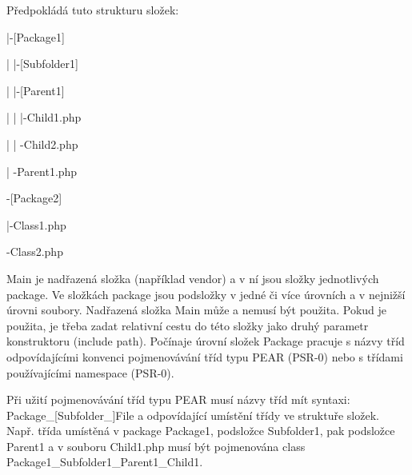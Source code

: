 Předpokládá tuto strukturu složek\+:


\begin{DoxyPre}[Main]\end{DoxyPre}
 
\begin{DoxyPre} |-[Package1]\end{DoxyPre}
 
\begin{DoxyPre} |  |-[Subfolder1]\end{DoxyPre}
 
\begin{DoxyPre} |     |-[Parent1]\end{DoxyPre}
 
\begin{DoxyPre} |     |  |-Child1.php\end{DoxyPre}
 
\begin{DoxyPre} |     |   -Child2.php\end{DoxyPre}
 
\begin{DoxyPre} |      -Parent1.php\end{DoxyPre}
 
\begin{DoxyPre}  -[Package2]\end{DoxyPre}
 
\begin{DoxyPre}    |-Class1.php\end{DoxyPre}
 
\begin{DoxyPre}     -Class2.php\end{DoxyPre}
 

Main je nadřazená složka (například vendor) a v ní jsou složky jednotlivých package. Ve složkách package jsou podsložky v jedné či více úrovních a v nejnižší úrovni soubory. Nadřazená složka Main může a nemusí být použita. Pokud je použita, je třeba zadat relativní cestu do této složky jako druhý parametr konstruktoru (include path). Počínaje úrovní složek Package pracuje s názvy tříd odpovídajícími konvenci pojmenovávání tříd typu P\+E\+AR (P\+S\+R-\/0) nebo s třídami používajícími namespace (P\+S\+R-\/0).

Při užití pojmenovávání tříd typu P\+E\+AR musí názvy tříd mít syntaxi\+: Package\+\_\+\mbox{[}Subfolder\+\_\+\mbox{]}File a odpovídající umístění třídy ve struktuře složek. Např. třída umístěná v package Package1, podsložce Subfolder1, pak podsložce Parent1 a v souboru Child1.\+php musí být pojmenována class Package1\+\_\+\+Subfolder1\+\_\+\+Parent1\+\_\+\+Child1.


